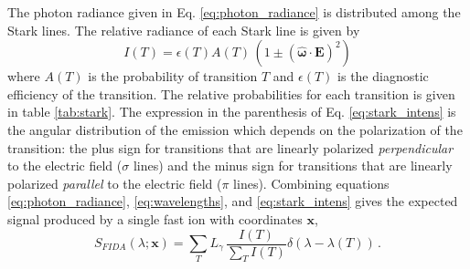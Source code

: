 The photon radiance given in Eq. \ref{eq:photon_radiance} is distributed among the Stark lines.
The relative radiance of each Stark line is given by
\begin{equation}\label{eq:stark_intens}
I(T) = \epsilon(T) A(T)\,(1 \pm (\boldsymbol{\hat{\omega}} \cdot \mathbf{E})^2)
\end{equation}
where $A(T)$ is the probability of transition $T$ and $\epsilon(T)$ is the diagnostic efficiency of the transition. The relative probabilities for each transition is given in table \ref{tab:stark}. The expression in the parenthesis of Eq. \ref{eq:stark_intens} is the angular distribution of the emission which depends on the polarization of the transition: the plus sign for transitions that are linearly polarized \textit{perpendicular} to the electric field ($\sigma$ lines) and the minus sign for transitions that are linearly polarized \textit{parallel} to the electric field ($\pi$ lines).
Combining equations \ref{eq:photon_radiance}, \ref{eq:wavelengths}, and \ref{eq:stark_intens} gives the expected signal produced by a single fast ion with coordinates $\mathbf{x}$,
\begin{equation}\label{eq:fida_weight}
    S_{FIDA}(\lambda;\mathbf{x}) = \sum_T L_{\gamma}\, \frac{I(T)}{\sum_T I(T)} \delta(\lambda - \lambda(T)) \,.
\end{equation}
